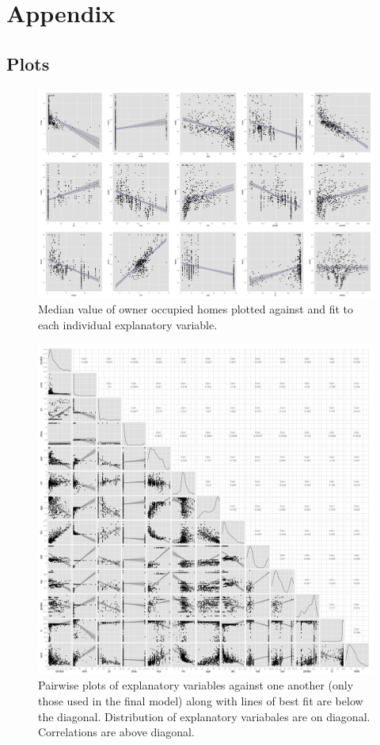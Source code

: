 \documentclass[12pt]{article}
\begin{document}
\section{Appendix}
\subsection{Plots}

\begin{figure}[hp]
\centering
\includegraphics[width=180mm]{simpleplots.png}
\caption{Median value of owner occupied homes plotted against and fit to each individual explanatory variable.}
\end{figure}

\begin{figure}[hp]
\centering
\includegraphics[width=180mm]{pairs.png}
\caption{Pairwise plots of explanatory variables against one another (only those used in the final model) along with lines of best fit are below the diagonal.  Distribution of explanatory variabales are on diagonal.  Correlations are above diagonal.}
\end{figure}
\end{document}
